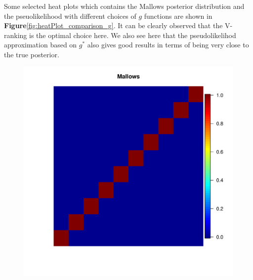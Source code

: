 \documentclass[11pt, oneside]{article}   	%
\begin{document}
Some selected heat plots which contains the Mallows posterior distribution and the pseuolikelihood with different choices of $g$ functions are shown in \textbf{Figure}\ref{fig:heatPlot_comparison_g}.  It can be clearly observed that the V-ranking is the optimal choice here. We also see here that the pseudolikelihod approximation based on $g^*$ also gives good results in terms of being very close to the true posterior.
\begin{figure}[h!]

		\begin{minipage}[t]{.45\textwidth}
			\centering
			\includegraphics[width=\textwidth]{figures/theorem2_2/heat_Mallows_N2000n10alpha1run1.pdf}
			

\end{minipage}
\end{figure}
\end{document}

